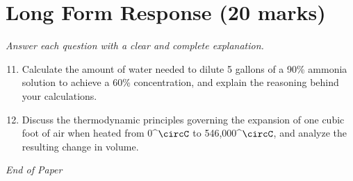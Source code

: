 \documentclass[12pt]{article}
\begin{document}
\section*{Long Form Response (20 marks)}
\textit{Answer each question with a clear and complete explanation.}
\begin{enumerate}[label=\arabic*.]
\setcounter{enumi}{10}
\item Calculate the amount of water needed to dilute 5 gallons of a 90\% ammonia solution to achieve a 60\% concentration, and explain the reasoning behind your calculations.
\item Discuss the thermodynamic principles governing the expansion of one cubic foot of air when heated from 0^\ensuremath{\circC} to 546,000^\ensuremath{\circC}, and analyze the resulting change in volume.
\end{enumerate}

\vfill
\noindent\textit{End of Paper}
\end{document}
